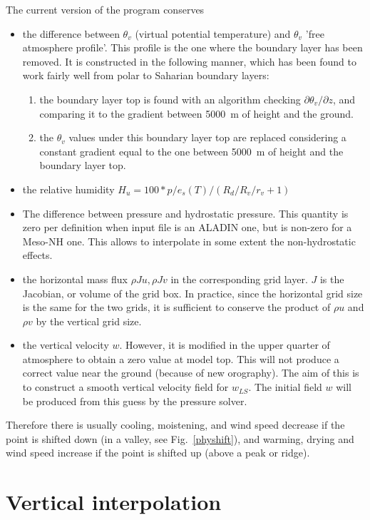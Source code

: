 \clearpage

The current version of the program conserves
\begin{itemize}
\item
the difference between $\theta_v$ (virtual potential temperature)
and $\theta_v$ 'free atmosphere profile'.
This profile is the one where the boundary layer has been removed.
It is constructed in the following
manner, which has been found to work fairly well from polar to Saharian
boundary layers:
\begin{enumerate}
\item the boundary layer top is found with an algorithm checking
$\partial \theta_v / \partial z$, and comparing it to
the gradient between 5000~m of height and the ground.
\item the $\theta_v$ values under this boundary layer top are replaced
considering a constant gradient equal to the one between 5000~m of height
and the boundary layer top.
\end{enumerate}
\item
the relative humidity $H_u=100 * p/e_s(T)/(R_d/R_v/r_v + 1)$
\item
The difference between pressure and hydrostatic pressure.
This quantity is zero per definition when input file is an ALADIN one, but
is non-zero for a Meso-NH one. This allows to interpolate in some
extent the non-hydrostatic effects.
\item
the horizontal mass flux $\rho J u, \rho J v$
in the corresponding grid layer. $J$ is the Jacobian, or volume of the grid
box. In practice, since the horizontal grid size is the same for the two
grids, it is sufficient to conserve the product of $\rho u$ and $\rho v$
by the vertical grid size.
\item
the vertical velocity $w$. However, it is modified in the upper quarter
of atmosphere to obtain a zero value at model top.
This will not produce a correct value near the ground (because of new orography).
The aim of this is to construct a smooth vertical velocity field for
$w_{LS}$. The initial field $w$ will be produced from this
guess by the pressure solver.
\end{itemize}

Therefore there is usually cooling, moistening, and wind speed decrease
if the point is shifted down (in a valley, see Fig.~\ref{physhift}),
and warming, drying and wind speed increase if the point is shifted up
(above a peak or ridge).

\section{Vertical interpolation}

